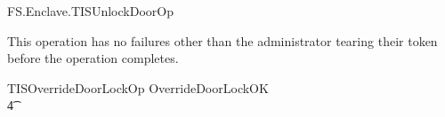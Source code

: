 \begin{traceunit}{FS.Enclave.TISUnlockDoorOp}
\end{traceunit}

This operation has no failures other
than the administrator tearing their token before the operation completes.

\begin{zed}
        TISOverrideDoorLockOp  OverrideDoorLockOK
\\ \t4  \lor
        [~ BadAdminLogout | enclaveStatus = waitingStartAdminOp 
\\ \t6  \land \The currentAdminOp = overrideLock     ~]
\end{zed}

